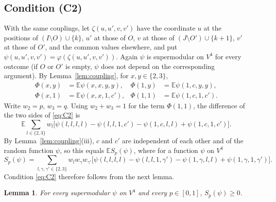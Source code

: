 \documentclass[11pt]{amsart}
\newtheorem{lemma}[theorem]{Lemma}
\theoremstyle{remark}
\numberwithin{equation}{section}
\newcommand{\E}{\mathbb E}
\newcommand{\1}{\mathbf 1}
\begin{document}
\subsection{Condition (C2)}
With the same couplings, let $\zeta(u,u',v,v')$ have the coordinate $u$ at the positions of $(I\setminus O)\cup\{k\}$, $u'$ at those of $O$, $v$ at those of $(J\setminus O')\cup\{k+1\}$, $v'$ at those of $O'$, and the common values elsewhere, and put $\psi(u,u',v,v')=\varphi(\zeta(u,u',v,v'))$. Again $\psi$ is supermodular on $V^4$ for every outcome (if $O$ or $O'$ is empty, $\psi$ does not depend on the corresponding argument). By Lemma~\ref{lem:coupling}, for $x,y\in\{2,3\}$,
\begin{align*}
\Phi(x,y)&=\E\psi(x,x,y,y), & \Phi(1,y)&=\E\psi(1,c,y,y),\\
\Phi(x,1)&=\E\psi(x,x,1,c'), & \Phi(1,1)&=\E\psi(1,c,1,c').
\end{align*}
Write $w_2=p$, $w_3=q$. Using $w_2+w_3=1$ for the term $\Phi(1,1)$, the difference of the two sides of \eqref{eq:C2} is
\[
\E\sum_{l\in\{2,3\}}w_l\bigl[\psi(l,l,l,l)-\psi(l,l,1,c')-\psi(1,c,l,l)+\psi(1,c,1,c')\bigr].
\]
By Lemma~\ref{lem:coupling}(iii), $c$ and $c'$ are independent of each other and of the random function $\psi$, so this equals $\E S_p(\psi)$, where for a function $\psi$ on $V^4$
\begin{equation}\label{eq:Sp}
S_p(\psi)=\sum_{l,\gamma,\gamma'\in\{2,3\}}w_lw_\gamma w_{\gamma'}\bigl[\psi(l,l,l,l)-\psi(l,l,1,\gamma')-\psi(1,\gamma,l,l)+\psi(1,\gamma,1,\gamma')\bigr].
\end{equation}
Condition \eqref{eq:C2} therefore follows from the next lemma.

\begin{lemma}\label{lem:certificate}
For every supermodular $\psi$ on $V^4$ and every $p\in[0,1]$, $S_p(\psi)\ge0$.
\end{lemma}
\end{document}
